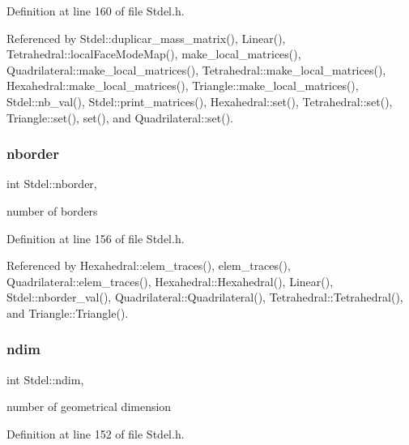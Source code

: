Definition at line 160 of file Stdel.\+h.



Referenced by Stdel\+::duplicar\+\_\+mass\+\_\+matrix(), Linear(), Tetrahedral\+::local\+Face\+Mode\+Map(), make\+\_\+local\+\_\+matrices(), Quadrilateral\+::make\+\_\+local\+\_\+matrices(), Tetrahedral\+::make\+\_\+local\+\_\+matrices(), Hexahedral\+::make\+\_\+local\+\_\+matrices(), Triangle\+::make\+\_\+local\+\_\+matrices(), Stdel\+::nb\+\_\+val(), Stdel\+::print\+\_\+matrices(), Hexahedral\+::set(), Tetrahedral\+::set(), Triangle\+::set(), set(), and Quadrilateral\+::set().

\mbox{\label{classStdel_ad0f111a2ba3d9415618c8408da3fc100}} 
\subsubsection{\texorpdfstring{nborder}{nborder}}
{\footnotesize\ttfamily int Stdel\+::nborder\hspace{0.3cm}{\ttfamily [protected]}, {\ttfamily [inherited]}}



number of borders 



Definition at line 156 of file Stdel.\+h.



Referenced by Hexahedral\+::elem\+\_\+traces(), elem\+\_\+traces(), Quadrilateral\+::elem\+\_\+traces(), Hexahedral\+::\+Hexahedral(), Linear(), Stdel\+::nborder\+\_\+val(), Quadrilateral\+::\+Quadrilateral(), Tetrahedral\+::\+Tetrahedral(), and Triangle\+::\+Triangle().

\mbox{\label{classStdel_a912f36b591d847eed2531a3b3a51a520}} 
\subsubsection{\texorpdfstring{ndim}{ndim}}
{\footnotesize\ttfamily int Stdel\+::ndim\hspace{0.3cm}{\ttfamily [protected]}, {\ttfamily [inherited]}}



number of geometrical dimension 



Definition at line 152 of file Stdel.\+h.



